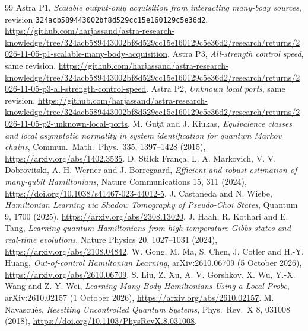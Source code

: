 \documentclass[11pt]{article}
\begin{document}
\begin{thebibliography}{99}
 Astra P1, \emph{Scalable output-only acquisition from interacting
many-body sources}, revision \texttt{324acb589443002bf8d529cc15e160129c5e36d2},
\url{https://github.com/harjassand/astra-research-knowledge/tree/324acb589443002bf8d529cc15e160129c5e36d2/research/returns/2026-11-05-p1-scalable-many-body-acquisition}.
 Astra P3, \emph{All-strength control speed}, same revision,
\url{https://github.com/harjassand/astra-research-knowledge/tree/324acb589443002bf8d529cc15e160129c5e36d2/research/returns/2026-11-05-p3-all-strength-control-speed}.
 Astra P2, \emph{Unknown local ports}, same revision,
\url{https://github.com/harjassand/astra-research-knowledge/tree/324acb589443002bf8d529cc15e160129c5e36d2/research/returns/2026-11-05-p2-unknown-local-ports}.
 M. Gu\c{t}\u{a} and J. Kiukas, \emph{Equivalence classes and local
asymptotic normality in system identification for quantum Markov chains},
Commun.\ Math.\ Phys.\ 335, 1397--1428 (2015),
\url{https://arxiv.org/abs/1402.3535}.
 D. Stilck Fran\c{c}a, L. A. Markovich, V. V. Dobrovitski,
A. H. Werner and J. Borregaard, \emph{Efficient and robust estimation of
many-qubit Hamiltonians}, Nature Communications 15, 311 (2024),
\url{https://doi.org/10.1038/s41467-023-44012-5}.
 J. Castaneda and N. Wiebe, \emph{Hamiltonian Learning via
Shadow Tomography of Pseudo-Choi States}, Quantum 9, 1700 (2025),
\url{https://arxiv.org/abs/2308.13020}.
 J. Haah, R. Kothari and E. Tang, \emph{Learning quantum
Hamiltonians from high-temperature Gibbs states and real-time evolutions},
Nature Physics 20, 1027--1031 (2024), \url{https://arxiv.org/abs/2108.04842}.
 W. Gong, M. Ma, S. Chen, J. Cotler and H.-Y. Huang,
\emph{Out-of-control Hamiltonian Learning}, arXiv:2610.06709
(5 October 2026), \url{https://arxiv.org/abs/2610.06709}.
 S. Liu, Z. Xu, A. V. Gorshkov, X. Wu, Y.-X. Wang and Z.-Y. Wei,
\emph{Learning Many-Body Hamiltonians Using a Local Probe}, arXiv:2610.02157
(1 October 2026), \url{https://arxiv.org/abs/2610.02157}.
 M. Navascu\'es, \emph{Resetting Uncontrolled Quantum Systems},
Phys.\ Rev.\ X 8, 031008 (2018),
\url{https://doi.org/10.1103/PhysRevX.8.031008}.
\end{thebibliography}
\end{document}
